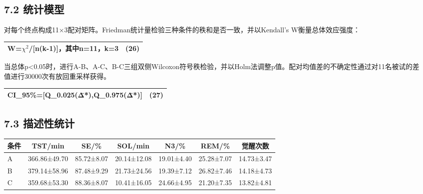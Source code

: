 \documentclass[UTF8,a4paper,12pt]{ctexart}
\begin{document}
\subsection{7.2 统计模型}

对每个终点构成11×3配对矩阵。Friedman统计量检验三种条件的秩和是否一致，并以Kendall's W衡量总体效应强度：

\begin{table}[H]
\centering
\small
\begin{adjustbox}{max width=\textwidth}
\begin{tabular}{lc}
\toprule
W=$\chi^2$/[n(k-1)]，其中n=11，k=3 & (26) \\
\midrule
\bottomrule
\end{tabular}
\end{adjustbox}
\end{table}

当总体p<0.05时，进行A-B、A-C、B-C三组双侧Wilcoxon符号秩检验，并以Holm法调整p值。配对均值差的不确定性通过对11名被试的差值进行30000次有放回重采样获得。

\begin{table}[H]
\centering
\small
\begin{adjustbox}{max width=\textwidth}
\begin{tabular}{lc}
\toprule
CI\_95\%=[Q\_0.025(Δ̄*),Q\_0.975(Δ̄*)] & (27) \\
\midrule
\bottomrule
\end{tabular}
\end{adjustbox}
\end{table}

\subsection{7.3 描述性统计}

\begin{table}[H]
\centering
\small
\begin{adjustbox}{max width=\textwidth}
\begin{tabular}{lcccccc}
\toprule
条件 & TST/min & SE/\% & SOL/min & N3/\% & REM/\% & 觉醒次数 \\
\midrule
A & 366.86±49.70 & 85.72±8.07 & 20.14±12.08 & 19.01±4.40 & 25.28±7.07 & 14.73±3.47 \\
B & 379.14±58.96 & 87.48±9.29 & 21.73±24.56 & 19.39±7.12 & 26.82±7.46 & 14.18±4.73 \\
C & 359.68±53.30 & 88.36±8.07 & 10.41±16.05 & 24.66±4.95 & 21.20±7.35 & 13.82±4.81 \\
\bottomrule
\end{tabular}
\end{adjustbox}
\end{table}
\end{document}
